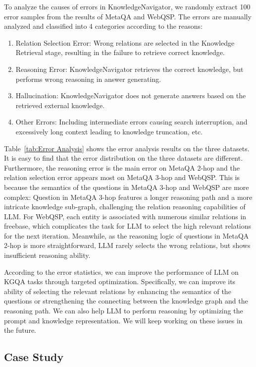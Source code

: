 \documentclass{article}
\begin{document}
To analyze the causes of errors in KnowledgeNavigator, we randomly extract 100 error samples from the results of MetaQA and WebQSP. The errors are manually analyzed and classified into 4 categories according to the reasons:

\begin{enumerate}
    \item Relation Selection Error: Wrong relations are selected in the Knowledge Retrieval stage, resulting in the failure to retrieve correct knowledge.
    \item Reasoning Error: KnowledgeNavigator retrieves the correct knowledge, but performs wrong reasoning in answer generating.
    \item Hallucination: KnowledgeNavigator does not generate answers based on the retrieved external knowledge.
    \item Other Errors: Including intermediate errors causing search interruption, and excessively long context leading to knowledge truncation, etc.
\end{enumerate}


Table~\ref{tab:Error Analysis} shows the error analysis results on the three datasets. It is easy to find that the error distribution on the three datasets are different. Furthermore, the reasoning error is the main error on MetaQA 2-hop and the relation selection error appears most on MetaQA 3-hop and WebQSP. This is because the semantics of the questions in MetaQA 3-hop and WebQSP are more complex: Question in MetaQA 3-hop features a longer reasoning path and a more intricate knowledge sub-graph, challenging the relation reasoning capabilities of LLM. 
For WebQSP, each entity is associated with numerous similar relations in freebase, which complicates the task for LLM to select the high relevant relations for the next iteration. Meanwhile, as the reasoning logic of questions in MetaQA 2-hop is more straightforward, LLM rarely selects the wrong relations, but shows insufficient reasoning ability.

According to the error statistics, we can improve the performance of LLM on KGQA tasks through targeted optimization. Specifically, we can improve its ability of selecting the relevant relations by enhancing the semantics of the questions or strengthening the connecting between the knowledge graph and the reasoning path. We can also help LLM to perform reasoning by optimizing the prompt and knowledge representation. We will keep working on these issues in the future.

\subsection{Case Study}
\end{document}
